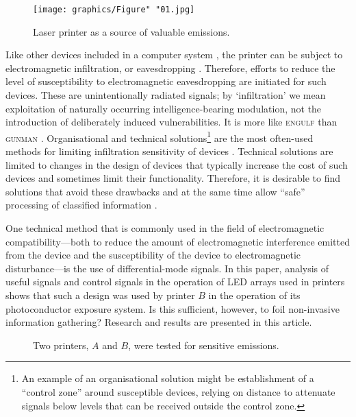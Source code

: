 \documentclass[letterpaper,journal]{ieeetran}
\begin{document}
\begin{figure}[ht]
    \centering
    \texttt{[image: graphics/Figure" "01.jpg]}
    \caption{Laser printer as a source of valuable emissions.}
    \label{figure:Figure_01}
\end{figure}

Like other devices included in a computer system \cite{Kuhn2002,Kubiak2016a},
the printer can be subject to electromagnetic infiltration, or eavesdropping
\cite{Ketenci2015a,Kubiak2016b}. Therefore, efforts to reduce the level of
susceptibility to electromagnetic eavesdropping are initiated for such
devices. These are unintentionally radiated signals; by `infiltration' we
mean exploitation of naturally occurring intelligence-bearing modulation, not
the introduction of deliberately induced vulnerabilities. It is more like
\textsc{engulf} than \textsc{gunman} \cite{Wright1987,Maneki2007a}.
Organisational and technical solutions\footnote{An example of an
organisational solution might be establishment of a ``control zone'' around
susceptible devices, relying on distance to attenuate signals below levels
that can be received outside the control zone.} are the most often-used
methods for limiting infiltration sensitivity of devices \cite{Kubiak2006a}.
Technical solutions are limited to changes in the
design of devices that typically increase the cost of such devices and
sometimes limit their functionality. Therefore, it is desirable to find
solutions that avoid these drawbacks and at the same time allow ``safe''
processing of classified information \cite{Wasfy2011a,Goel2012a}.

One technical method that is commonly used in the field of electromagnetic
compatibility---both to reduce the amount of electromagnetic interference
emitted from the device and the susceptibility of the device to
electromagnetic disturbance---is the use of differential-mode signals.
In this paper, analysis of useful signals and control signals
\cite{Kubiak2017d} in the operation of LED arrays
used in printers shows that such a design was used by printer $B$ in the
operation of its photoconductor exposure system. Is this sufficient, however,
to foil non-invasive information gathering? Research and results are
presented in this article.

\begin{figure*}[ht]
    \centering
    \hfill
    \caption{Two printers, $A$ and $B$, were tested for sensitive emissions.}
    \label{figure:Figure_02}
\end{figure*}
\end{document}
